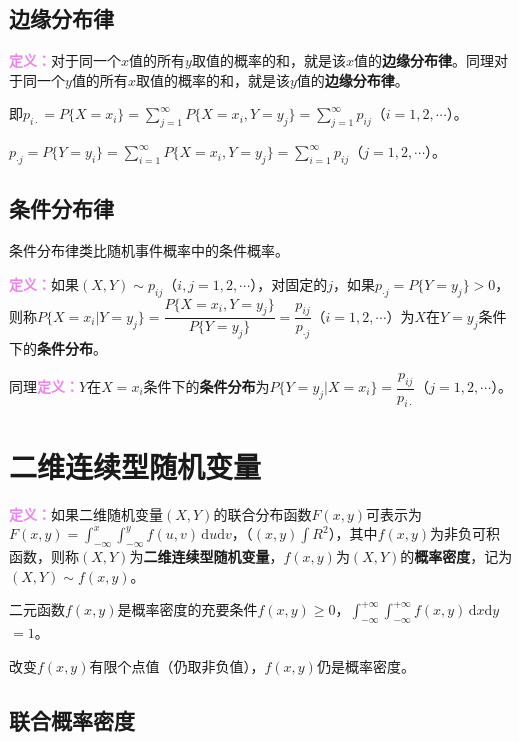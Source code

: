 \documentclass[UTF8, 12pt]{ctexart}
\begin{document}
\subsection{边缘分布律}

\textcolor{violet}{\textbf{定义：}}对于同一个$x$值的所有$y$取值的概率的和，就是该$x$值的\textbf{边缘分布律}。同理对于同一个$y$值的所有$x$取值的概率的和，就是该$y$值的\textbf{边缘分布律}。

即$p_{i\cdot}=P\{X=x_i\}=\sum\limits_{j=1}^\infty P\{X=x_i,Y=y_j\}=\sum\limits_{j=1}^\infty p_{ij}$（$i=1,2,\cdots$）。

$p_{\cdot j}=P\{Y=y_i\}=\sum\limits_{i=1}^\infty P\{X=x_i,Y=y_j\}=\sum\limits_{i=1}^\infty p_{ij}$（$j=1,2,\cdots$）。

\subsection{条件分布律}

条件分布律类比随机事件概率中的条件概率。

\textcolor{violet}{\textbf{定义：}}如果$(X,Y)\sim p_{ij}$（$i,j=1,2,\cdots$），对固定的$j$，如果$p_{\cdot j}=P\{Y=y_j\}>0$，则称$P\{X=x_i|Y=y_j\}=\dfrac{P\{X=x_i,Y=y_j\}}{P\{Y=y_j\}}=\dfrac{p_{ij}}{p_{\cdot j}}$（$i=1,2,\cdots$）为$X$在$Y=y_j$条件下的\textbf{条件分布}。

同理\textcolor{violet}{\textbf{定义：}}$Y$在$X=x_i$条件下的\textbf{条件分布}为$P\{Y=y_j|X=x_i\}=\dfrac{p_{ij}}{p_{i\cdot}}$（$j=1,2,\cdots$）。

\section{二维连续型随机变量}

\textcolor{violet}{\textbf{定义：}}如果二维随机变量$(X,Y)$的联合分布函数$F(x,y)$可表示为$F(x,y)=\int_{-\infty}^x\int_{-\infty}^yf(u,v)\,\textrm{d}u\textrm{d}v$，（$(x,y)\int R^2$），其中$f(x,y)$为非负可积函数，则称$(X,Y)$为\textbf{二维连续型随机变量}，$f(x,y)$为$(X,Y)$的\textbf{概率密度}，记为$(X,Y)\sim f(x,y)$。

二元函数$f(x,y)$是概率密度的充要条件$f(x,y)\geqslant0$，$\int_{-\infty}^{+\infty}\int_{-\infty}^{+\infty}f(x,y)\,\textrm{d}x\textrm{d}y$\\$=1$。

改变$f(x,y)$有限个点值（仍取非负值），$f(x,y)$仍是概率密度。

\subsection{联合概率密度}
\end{document}
